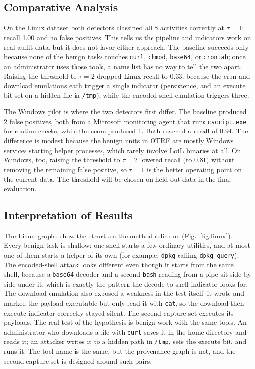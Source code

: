 \documentclass[conference]{IEEEtran}
\newcommand{\LinTotal}{8}
\newcommand{\LinScoreRec}{1.00}
\newcommand{\LinScoreTwoRec}{0.33}
\newcommand{\WinBaseFP}{2}
\newcommand{\WinScoreFP}{1}
\newcommand{\WinScoreRec}{0.94}
\newcommand{\WinScoreTwoRec}{0.81}
\begin{document}
\subsection{Comparative Analysis}
On the Linux dataset both detectors classified all \LinTotal{} activities
correctly at $\tau=1$: recall \LinScoreRec{} and no false positives. This
tells us the pipeline and indicators work on real audit data, but it does not
favor either approach. The baseline succeeds only because none of the benign
tasks touches \texttt{curl}, \texttt{chmod}, \texttt{base64}, or
\texttt{crontab}; once an administrator uses those tools, a name list has no
way to tell the two apart. Raising the threshold to $\tau=2$ dropped Linux
recall to \LinScoreTwoRec{}, because the cron and download emulations each
trigger a single indicator (persistence, and an execute bit set on a hidden
file in \texttt{/tmp}), while the encoded-shell emulation triggers three.

The Windows pilot is where the two detectors first differ. The baseline
produced \WinBaseFP{} false positives, both from a Microsoft monitoring agent
that runs \texttt{cscript.exe} for routine checks, while the score produced
\WinScoreFP{}. Both reached a recall of \WinScoreRec{}. The difference is
modest because the benign units in OTRF are mostly Windows services starting
helper processes, which rarely involve LotL binaries at all. On Windows, too,
raising the threshold to $\tau=2$ lowered recall (to \WinScoreTwoRec{})
without removing the remaining false positive, so $\tau=1$ is the better
operating point on the current data. The threshold will be chosen on
held-out data in the final evaluation.

\subsection{Interpretation of Results}
The Linux graphs show the structure the method relies on
(Fig.~\ref{fig:linux}). Every benign task is shallow: one shell starts a few
ordinary utilities, and at most one of them starts a helper of its own (for
example, \texttt{dpkg} calling \texttt{dpkg-query}). The encoded-shell attack
looks different even though it starts from the same shell, because a
\texttt{base64} decoder and a second \texttt{bash} reading from a pipe sit
side by side under it, which is exactly the pattern the decode-to-shell
indicator looks for. The download emulation also exposed a weakness in the
test itself: it wrote and marked the payload executable but only read it
with \texttt{cat}, so the download-then-execute indicator correctly stayed
silent. The second capture set executes its payloads. The real test of the
hypothesis is benign work with the same tools. An administrator who
downloads a file with \texttt{curl} saves it in the home directory and reads
it; an attacker writes it to a hidden path in \texttt{/tmp}, sets the execute
bit, and runs it. The tool name is the same, but the provenance graph is
not, and the second capture set is designed around such pairs.
\end{document}
